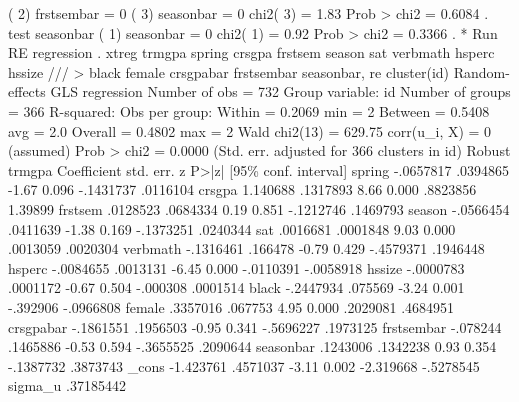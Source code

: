  ( 2)  frstsembar = 0
 ( 3)  seasonbar = 0
{\smallskip}
           chi2(  3) =    1.83
         Prob > chi2 =    0.6084
{\smallskip}
. test seasonbar
{\smallskip}
 ( 1)  seasonbar = 0
{\smallskip}
           chi2(  1) =    0.92
         Prob > chi2 =    0.3366
{\smallskip}
. * Run RE regression
. xtreg trmgpa spring crsgpa frstsem season sat verbmath hsperc hssize ///
> black female crsgpabar frstsembar seasonbar, re cluster(id)
{\smallskip}
Random-effects GLS regression                   Number of obs     =        732
Group variable: id                              Number of groups  =        366
{\smallskip}
R-squared:                                      Obs per group:
     Within  = 0.2069                                         min =          2
     Between = 0.5408                                         avg =        2.0
     Overall = 0.4802                                         max =          2
{\smallskip}
                                                Wald chi2(13)     =     629.75
corr(u_i, X) = 0 (assumed)                      Prob > chi2       =     0.0000
{\smallskip}
                                   (Std. err. adjusted for 366 clusters in id)
             {\VBAR}               Robust
      trmgpa {\VBAR} Coefficient  std. err.      z    P>|z|     [95\% conf. interval]
      spring {\VBAR}  -.0657817   .0394865    -1.67   0.096    -.1431737    .0116104
      crsgpa {\VBAR}   1.140688   .1317893     8.66   0.000     .8823856     1.39899
     frstsem {\VBAR}   .0128523   .0684334     0.19   0.851    -.1212746    .1469793
      season {\VBAR}  -.0566454   .0411639    -1.38   0.169    -.1373251    .0240344
         sat {\VBAR}   .0016681   .0001848     9.03   0.000     .0013059    .0020304
    verbmath {\VBAR}  -.1316461    .166478    -0.79   0.429    -.4579371    .1946448
      hsperc {\VBAR}  -.0084655   .0013131    -6.45   0.000    -.0110391   -.0058918
      hssize {\VBAR}  -.0000783   .0001172    -0.67   0.504     -.000308    .0001514
       black {\VBAR}  -.2447934    .075569    -3.24   0.001     -.392906   -.0966808
      female {\VBAR}   .3357016    .067753     4.95   0.000     .2029081    .4684951
   crsgpabar {\VBAR}  -.1861551   .1956503    -0.95   0.341    -.5696227    .1973125
  frstsembar {\VBAR}   -.078244   .1465886    -0.53   0.594    -.3655525    .2090644
   seasonbar {\VBAR}   .1243006   .1342238     0.93   0.354    -.1387732    .3873743
       _cons {\VBAR}  -1.423761   .4571037    -3.11   0.002    -2.319668   -.5278545
     sigma_u {\VBAR}  .37185442
